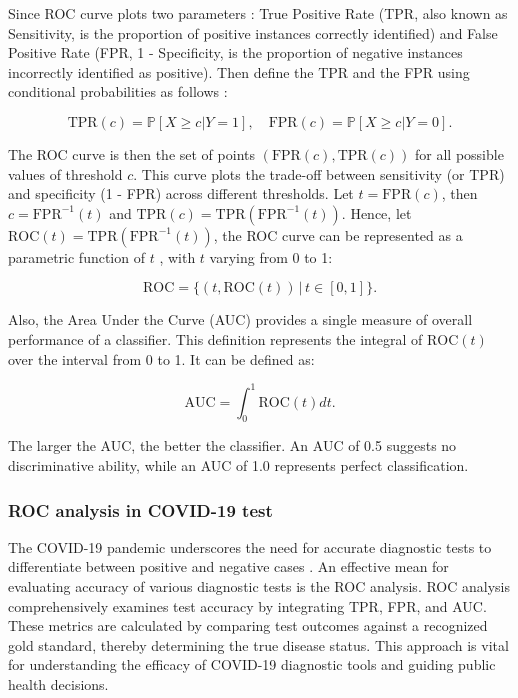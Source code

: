 \documentclass{article}\usepackage[]{graphicx}\usepackage[]{xcolor}
\numberwithin{equation}{section}
\begin{document}
\noindent
Since ROC curve plots two parameters \cite{rocAnalysis}: True Positive Rate (TPR, also known as Sensitivity, is the proportion of positive instances correctly identified) and False Positive Rate (FPR, 1 - Specificity, is the proportion of negative instances incorrectly identified as positive). Then define the TPR and the FPR using conditional probabilities as follows \cite{Pepe2003}:

\[ \text{TPR}(c) = \mathbb{P}[X \geq c | Y = 1], \quad \text{FPR}(c) = \mathbb{P}[X \geq c | Y = 0].\]

\noindent
The ROC curve is then the set of points $(\text{FPR}(c), \text{TPR}(c))$ for all possible values of threshold $c$. This curve plots the trade-off between sensitivity (or TPR) and specificity (1 - FPR) across different thresholds. Let $t=\text{FPR}(c)$, then $c = \text{FPR}^{-1}(t)$ and $\text{TPR}(c)= \text{TPR}(\text{FPR}^{-1}(t))$. Hence, let $\text{ROC}(t)= \text{TPR}(\text{FPR}^{-1}(t))$, the ROC curve can be represented as a parametric function of $t$ \cite{Pepe2003} , with $t$ varying from 0 to 1:

\[ \text{ROC} = \{ (t, \text{ROC}(t)) \,|\, t \in [0, 1] \}.\]

\noindent
Also, the Area Under the Curve (AUC) \cite{Pepe2003}  provides a single measure of overall performance of a classifier. This definition represents the integral of $\text{ROC}(t)$ over the interval from 0 to 1. It can be defined as:

\[ \text{AUC} = \int_{0}^{1} \text{ROC}(t) dt.\]

\noindent
The larger the AUC, the better the classifier. An AUC of 0.5 suggests no discriminative ability, while an AUC of 1.0 represents perfect classification.

\subsubsection{ROC analysis in COVID-19 test}

The COVID-19 pandemic underscores the need for accurate diagnostic tests to differentiate between positive and negative cases \cite{Garcia2021ROCAlly}. An effective mean for evaluating accuracy of various diagnostic tests is the ROC analysis. ROC analysis comprehensively examines test accuracy by integrating TPR, FPR, and AUC. These metrics are calculated by comparing test outcomes against a recognized gold standard, thereby determining the true disease status. This approach is vital for understanding the efficacy of COVID-19 diagnostic tools and guiding public health decisions.\\
\end{document}
